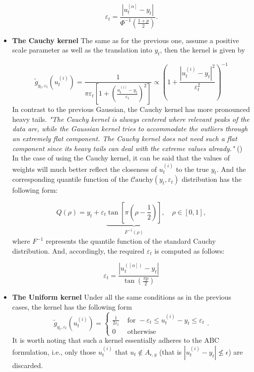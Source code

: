\begin{itemize}
    \begin{equation}
        \varepsilon_t=\frac{\left|u_t^{[\alpha]}-y_t\right|}{\Phi^{-1}\left(\frac{1+p}{2}\right)}.
        \label{eq:radius_eq_for_kernel_tuning}
    \end{equation}

    \item \textbf{The Cauchy kernel} The same as for the previous one, assume a positive scale parameter as well as the translation into \(y_t\), then the kernel is given by

    \begin{equation}
        \tilde{g}_{y_t, \varepsilon_t}\left(u_t^{(i)}\right) = \frac{1}{\pi \varepsilon_t\left[1+\left(\frac{u_t^{(i)}-y_t}{\varepsilon_t}\right)^2\right]} \propto \left(1+\frac{\left|u_t^{(i)}-y_t\right|^2}{\varepsilon_t^2}\right)^{-1}
    \end{equation}
    In contrast to the previous Gaussian, the Cauchy kernel has more pronounced heavy tails.
    {\em
    "The Cauchy kernel is always centered where relevant peaks of the data are, while the Gaussian kernel tries to accommodate the outliers through an extremely flat component. The Cauchy kernel does not need such a flat component since its heavy tails can deal with the extreme values already."
    } (\cite{kalantan_quantile-based_2019})
    In the case of using the Cauchy kernel, it can be said that the values of weights will much better reflect the closeness of \(u_t^{(i)}\) to the true \(y_t\). And the corresponding quantile function of the \(\mathcal{C}\text{auchy}\left(y_t, \varepsilon_t\right)\) distribution has the following form:

    \begin{equation*}
        Q(\rho) = y_t+\varepsilon_t \underbrace{\tan \left[\pi\left(\rho-\frac{1}{2}\right)\right]}_{\substack{\text{\(F^{-1}(\rho)\)}}} , \quad \rho \in[0,1],
    \end{equation*}
    \noindent where \(F^{-1}\) represents the quantile function of the standard Cauchy distribution. And, accordingly, the required \(\varepsilon_t\) is computed as follows:

    \begin{equation}
        \varepsilon_t=\frac{\left|u_t^{([\alpha])}-y_t\right|}{\tan \left(\frac{\pi p}{2}\right)}
    \end{equation}
        
    \item \textbf{The Uniform kernel} Under all the same conditions as in the previous cases, the kernel has the following form
    \begin{equation}
        \tilde{g}_{y_t, \varepsilon_t}\left(u_t^{(i)}\right) = \begin{cases}\frac{1}{2 \varepsilon_t} & \text { for }-\varepsilon_t \leq u_t^{(i)} - y_t \leq \varepsilon_t \\ 0 & \text { otherwise }\end{cases}.
    \end{equation}
    It is worth noting that such a kernel essentially adheres to the ABC formulation, i.e., only those \(u_t^{(i)}\) that \(u_t \notin A_{\epsilon, y}\) (that is \( \left|u_t^{(i)} - y_t\right| \nleq \epsilon\)) are discarded.


\end{itemize}
